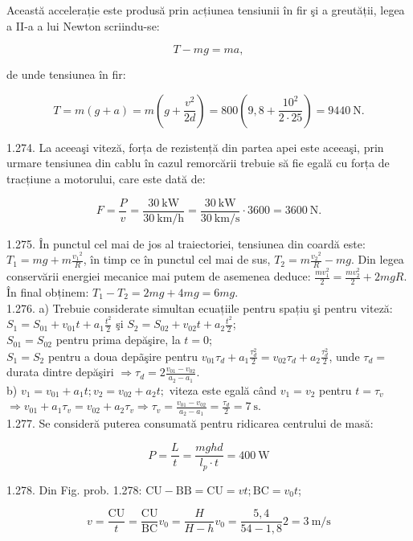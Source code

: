 Această accelerație este produsă prin acțiunea tensiunii în fir şi a greutății, legea a II-a a lui Newton scriindu-se:

$$
T-m g=m a,
$$

de unde tensiunea în fir:

$$
T=m(g+a)=m\left(g+\frac{v^{2}}{2 d}\right)=800\left(9,8+\frac{10^{2}}{2 \cdot 25}\right)=9440 \mathrm{~N} .
$$

1.274. La aceeaşi viteză, forța de rezistență din partea apei este aceeaşi, prin urmare tensiunea din cablu în cazul remorcării trebuie să fie egală cu forța de tracțiune a motorului, care este dată de:

$$
F=\frac{P}{v}=\frac{30 \mathrm{~kW}}{30 \mathrm{~km} / \mathrm{h}}=\frac{30 \mathrm{~kW}}{30 \mathrm{~km} / \mathrm{s}} \cdot 3600=3600 \mathrm{~N} .
$$

1.275. În punctul cel mai de jos al traiectoriei, tensiunea din coardă este: $T_{1}=m g+m \frac{v_{1}{ }^{2}}{R}$, în timp ce în punctul cel mai de sus, $T_{2}=m \frac{v_{2}{ }^{2}}{R}-m g$. Din legea conservării energiei mecanice mai putem de asemenea deduce: $\frac{m v_{1}^{2}}{2}=\frac{m v_{2}^{2}}{2}+2 m g R$. În final obținem: $T_{1}-T_{2}=2 m g+4 m g=6 m g$.\\
1.276. a) Trebuie considerate simultan ecuațiile pentru spațiu şi pentru viteză:\\
$S_{1}=S_{01}+v_{01} t+a_{1} \frac{t^{2}}{2}$ şi $S_{2}=S_{02}+v_{02} t+a_{2} \frac{t^{2}}{2}$;\\
$S_{01}=S_{02}$ pentru prima depăşire, la $t=0$;\\
$S_{1}=S_{2}$ pentru a doua depãşire pentru $v_{01} \tau_{d}+a_{1} \frac{\tau_{d}^{2}}{2}=v_{02} \tau_{d}+a_{2} \frac{\tau_{d}^{2}}{2}$, unde $\tau_{d}=$ durata dintre depăşiri $\Rightarrow \tau_{d}=2 \frac{v_{01}-v_{02}}{a_{2}-a_{1}}$.\\
b) $v_{1}=v_{01}+a_{1} t ; v_{2}=v_{02}+a_{2} t ;$ viteza este egală când $v_{1}=v_{2}$ pentru $t=\tau_{v}$ $\Rightarrow v_{01}+a_{1} \tau_{v}=v_{02}+a_{2} \tau_{v} \Rightarrow \tau_{v}=\frac{v_{01}-v_{02}}{a_{2}-a_{1}}=\frac{\tau_{d}}{2}=7 \mathrm{~s}$.\\
1.277. Se consideră puterea consumată pentru ridicarea centrului de masă:

$$
P=\frac{L}{t}=\frac{m g h d}{l_{p} \cdot t}=400 \mathrm{~W}
$$

1.278. Din Fig. prob. 1.278: $\mathrm{CU}-\mathrm{BB}=\mathrm{CU}=v t ; \mathrm{BC}=v_{0} t$;

$$
v=\frac{\mathrm{CU}}{t}=\frac{\mathrm{CU}}{\mathrm{BC}} v_{0}=\frac{H}{H-h} v_{0}=\frac{5,4}{54-1,8} 2=3 \mathrm{~m} / \mathrm{s}
$$

